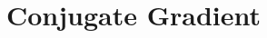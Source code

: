 \documentclass[../../main.tex]{subfiles}
\begin{document}
\chapter{Conjugate Gradient}\label{ch:CG}
\end{document}
